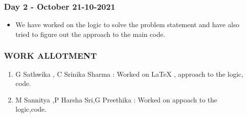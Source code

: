 \documentclass[14pt]{beamer}
\begin{document}
  \begin{frame}
	\frametitle{Day 2 - October 21-10-2021}
        
	\begin{itemize}
	    \item We have worked on the logic to solve the problem statement and have also tried to figure out the approach to the main code. 
	\end{itemize}
	
  \end{frame}
  \begin{frame}
  \frametitle{WORK ALLOTMENT}
    \begin{enumerate}
      \item G Sathwika , C Srinika Sharma : Worked on LaTeX , approach to the logic, code.
      \item M Sannitya ,P Harsha Sri,G Preethika : Worked on appoach to the logic,code.
    \end{enumerate}
  \end{frame}
\end{document}
